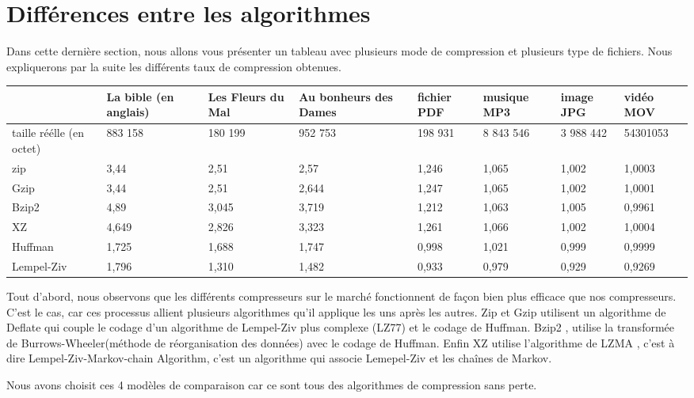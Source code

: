 \documentclass{report}
\begin{document}
\section*{Différences entre les algorithmes}
Dans cette dernière section, nous allons vous présenter un tableau avec plusieurs mode de compression et plusieurs type de fichiers. 
Nous expliquerons par la suite les différents taux de compression obtenues. 


\begin{flushleft}
{\renewcommand{\arraystretch}{2}
\begin{tabular}{|p{1.5cm}|p{1.5cm}|p{1.5cm}|p{1.5cm}|p{1.5cm}|p{1.5cm}|p{1.5cm}|p{1.5cm}|}
\hline
 & La bible (en anglais)  & Les Fleurs du Mal  & Au bonheurs des Dames & fichier PDF & musique  MP3 & image JPG & vidéo MOV\\
\hline
taille réélle (en octet)  & 883 158 & 180 199 & 952 753 & 198 931 & 8 843 546 & 3 988 442 & 54301053 \\\hline
zip & 3,44 & 2,51 & 2,57 & 1,246 & 1,065 & 1,002 & 1,0003 \\
\hline
Gzip & 3,44 & 2,51 & 2,644 & 1,247 & 1,065 & 1,002 & 1,0001 \\
\hline
Bzip2 & 4,89 & 3,045 & 3,719 & 1,212 & 1,063 & 1,005 & 0,9961\\
\hline
XZ & 4,649 & 2,826 & 3,323 & 1,261 & 1,066 & 1,002 & 1,0004\\
\hline
Huffman & 1,725 & 1,688 & 1,747 & 0,998 & 1,021 & 0,999 & 0,9999 \\
\hline
Lempel-Ziv & 1,796 & 1,310 & 1,482 & 0,933 & 0,979 & 0,929 & 0,9269\\
\hline

\end{tabular}
}
\end{flushleft}

Tout d'abord, nous observons que les différents compresseurs sur le marché fonctionnent de façon bien plus efficace que nos compresseurs. C'est le cas, car ces processus allient plusieurs algorithmes qu'il applique les uns après les autres. Zip et Gzip utilisent un algorithme de Deflate qui couple le codage d'un algorithme de Lempel-Ziv plus complexe (LZ77) et le codage de Huffman. Bzip2 , utilise  la transformée de Burrows-Wheeler(méthode de réorganisation des données) avec le codage de Huffman. Enfin XZ utilise l'algorithme de LZMA , c'est à dire Lempel-Ziv-Markov-chain Algorithm, c'est un algorithme qui associe Lemepel-Ziv et les chaînes de Markov.

Nous avons choisit ces 4 modèles de comparaison car ce sont tous des algorithmes de compression sans perte. 
\end{document}
